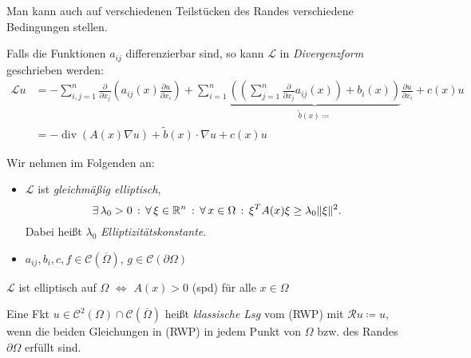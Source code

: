 \documentclass{cheat-sheet}
\newcommand{\Cont}{\mathcal{C}} %
\newcommand{\clos}[1]{\overline{#1}} %
\newcommand{\cOmega}{\clos{\Omega}} %
\newcommand{\bOmega}{\partial \Omega} %
\newcommand{\LL}{\mathcal{L}} %
\newcommand{\RR}{\mathcal{R}} %
\DeclareMathOperator{\dive}{div} %
\begin{document}
\begin{bem}
  Man kann auch auf verschiedenen Teilstücken des Randes verschiedene Bedingungen stellen.
\end{bem}

\begin{bem}
  Falls die Funktionen $a_{ij}$ differenzierbar sind, so kann $\LL$ in \emph{Divergenzform} geschrieben werden:
  \begin{align*}
    \LL u & = - \!\!\! \sum_{i,j=1}^n \tfrac{\partial}{\partial x_j} \left( a_{ij}(x) \tfrac{\partial u}{\partial x_i} \right) \!+\! \sum_{i=1}^n \underbrace{\left((\sum_{j=1}^n \tfrac{\partial}{\partial x_j} a_{ij}(x) ) \!+\! b_i(x)\right)}_{\tilde{b}(x) \coloneqq} \tfrac{\partial u}{\partial x_i} \!+\! c(x) u \\
    & = - \dive(A(x) \nabla u) + \tilde{b}(x) \cdot \nabla u + c(x) u
  \end{align*}
\end{bem}

\begin{voraussetzung}
  Wir nehmen im Folgenden an:
  \begin{itemize}
    \item $\LL$ ist \emph{gleichmäßig elliptisch}, \dh{}
    \[ \exists \, {\lambda_0 > 0} \,:\, \forall \, {\xi \in \mathbb{R}^n} \,:\, \forall \, {x \in \Omega} \,:\, \xi^T A(x) \xi \geq \lambda_0 \lVert\xi\rVert^2. \]
    Dabei heißt $\lambda_0$ \emph{Elliptizitätskonstante}.
    \item $a_{ij}, b_i, c, f \in \Cont(\cOmega)$, $g \in \Cont(\bOmega)$
  \end{itemize}
\end{voraussetzung}

\begin{bem}
  $\LL$ ist elliptisch auf $\Omega$ $\iff$ $A(x) > 0$ (spd) für alle $x \in \Omega$
\end{bem}

\begin{defn}
  Eine Fkt $u \in \Cont^2(\Omega) \cap \Cont(\cOmega)$ heißt \emph{klassische Lsg} vom (RWP) mit $\RR u \coloneqq u$, wenn die beiden Gleichungen in (RWP) in jedem Punkt von $\Omega$ bzw. des Randes $\bOmega$ erfüllt sind.
\end{defn}
\end{document}
